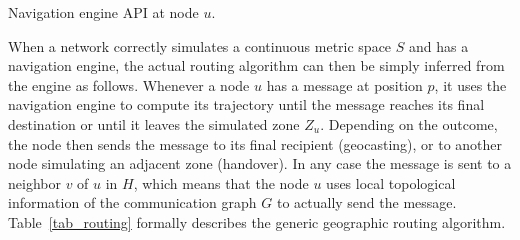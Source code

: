\documentclass{article}
\begin{document}
\begin{table}[h]
\begin{center}
\end{center}
\caption{Navigation engine API at node $u$.}
\label{tab_navigation}
\end{table}

When a network correctly simulates a continuous metric space $S$ and has a navigation engine, the actual routing algorithm can then be simply inferred from the engine as follows. Whenever a node $u$ has a message at position $p$, it uses the navigation engine to compute its trajectory until the message reaches its final destination or until it leaves the simulated zone $Z_u$. Depending on the outcome, the node then sends the message to its final recipient (geocasting), or to another node simulating an adjacent zone (handover). In any case the message is sent to a neighbor $v$ of $u$ in $H$, which means that the node $u$ uses local topological information of the communication graph $G$ to actually send the message. Table~\ref{tab_routing} formally describes the generic geographic routing algorithm.
\end{document}
